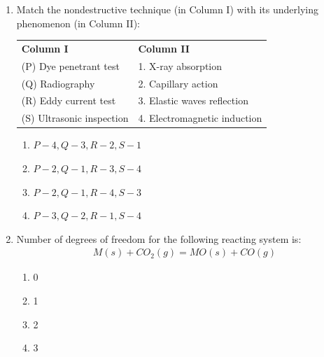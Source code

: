 \documentclass[journal]{IEEEtran}
\theoremstyle{remark}
\begin{document}
\begin{enumerate}[resume]
\item Match the nondestructive technique (in Column I) with its underlying phenomenon (in Column II): \hfill{}
\begin{center}
\begin{tabular}{ll}
\textbf{Column I} & \textbf{Column II} \\
(P) Dye penetrant test & 1. X-ray absorption \\
(Q) Radiography & 2. Capillary action \\
(R) Eddy current test & 3. Elastic waves reflection \\
(S) Ultrasonic inspection & 4. Electromagnetic induction \\
\end{tabular}
\end{center}
\begin{multicols}{2}
\begin{enumerate}
\item $P-4, Q-3, R-2, S-1$
\item $P-2, Q-1, R-3, S-4$
\item $P-2, Q-1, R-4, S-3$
\item $P-3, Q-2, R-1, S-4$
\end{enumerate}
\end{multicols}

\item Number of degrees of freedom for the following reacting system is: \hfill{} 
\begin{align}
  M(s) + CO_2(g) = MO(s) + CO(g)
\end{align}

\begin{multicols}{4}
\begin{enumerate}
\item 0
\item 1
\item 2
\item 3
\end{enumerate}
\end{multicols}


\end{enumerate}
\end{document}
